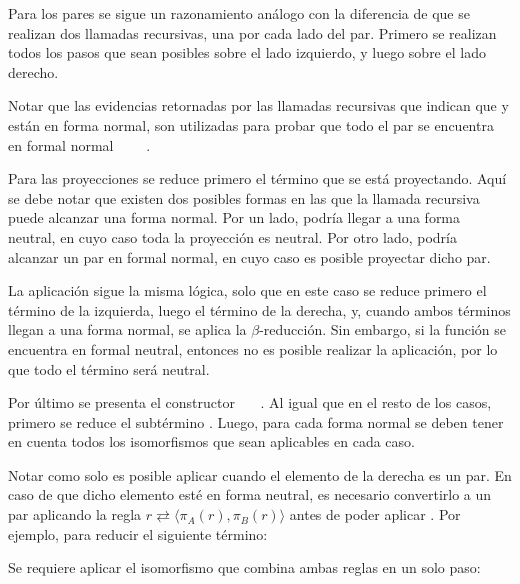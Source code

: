 Para los pares se sigue un razonamiento análogo con la diferencia de que se realizan dos llamadas recursivas, una por cada lado del par.
Primero se realizan todos los pasos que sean posibles sobre el lado izquierdo, y luego sobre el lado derecho.


Notar que las evidencias retornadas por las llamadas recursivas que indican que  y  están en forma normal, son utilizadas para probar que todo el par se encuentra en formal normal ~~\const{,}~~\const{$\rangle$}.

Para las proyecciones se reduce primero el término que se está proyectando.
Aquí se debe notar que existen dos posibles formas en las que la llamada recursiva puede alcanzar una forma normal.
Por un lado, podría llegar a una forma neutral, en cuyo caso toda la proyección es neutral.
Por otro lado, podría alcanzar un par en formal normal, en cuyo caso es posible proyectar dicho par.


La aplicación sigue la misma lógica, solo que en este caso se reduce primero el término de la izquierda, luego el término de la derecha, y, cuando ambos términos llegan a una forma normal, se aplica la $\beta$-reducción.
Sin embargo, si la función se encuentra en formal neutral, entonces no es posible realizar la aplicación, por lo que todo el término será neutral.


Por último se presenta el constructor \const{[}~~\const{]≡}~.
Al igual que en el resto de los casos, primero se reduce el subtérmino .
Luego, para cada forma normal se deben tener en cuenta todos los isomorfismos que sean aplicables en cada caso.


Notar como solo es posible aplicar  cuando el elemento de la derecha es un par.
En caso de que dicho elemento esté en forma neutral, es necesario convertirlo a un par aplicando la regla $r \rightleftarrows \langle \pi_A (r), \pi_B(r) \rangle$ antes de poder aplicar .
Por ejemplo, para reducir el siguiente término:


Se requiere aplicar el isomorfismo  que combina ambas reglas en un solo paso:

